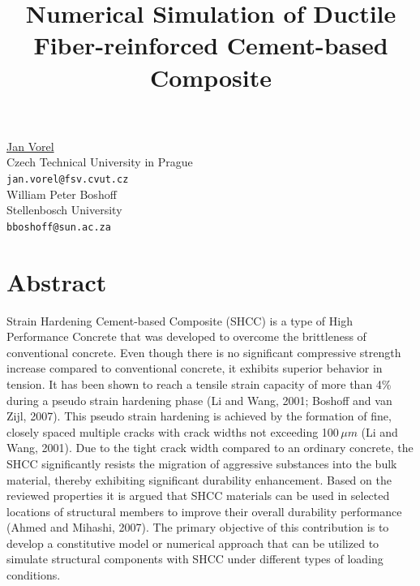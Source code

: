 \documentclass[article, A4, 11pt]{llncs}%
\begin{document}
\title{Numerical Simulation of Ductile Fiber-reinforced Cement-based Composite}
 \author{} \institute{}
\maketitle
\begin{center}
{\large \underline{Jan Vorel}}\\
Czech Technical University in Prague\\
{\tt jan.vorel@fsv.cvut.cz}
\\ \vspace{4mm}
{\large William Peter Boshoff}\\
Stellenbosch University\\
{\tt bboshoff@sun.ac.za}
\end{center}

\section*{Abstract}
Strain Hardening Cement-based Composite (SHCC) is a type of High Performance Concrete that was developed to overcome the brittleness of conventional concrete. Even though there is no significant compressive strength increase compared to conventional concrete, it exhibits superior behavior in tension. It has been shown to reach a tensile strain capacity of more than 4\% during a pseudo strain hardening phase (Li and Wang, 2001; Boshoff and van Zijl, 2007). This pseudo strain hardening is achieved by the formation of fine, closely spaced multiple cracks with crack widths not exceeding 100\,$\mu m$ (Li and Wang, 2001). Due to the tight crack width compared to an ordinary concrete, the SHCC significantly resists the migration of aggressive substances into the bulk material, thereby exhibiting significant durability enhancement. Based on the reviewed properties it is argued that SHCC materials can be used in selected locations of structural members to improve their overall durability performance (Ahmed and Mihashi, 2007). The primary objective of this contribution is to develop a constitutive model or numerical approach that can be utilized to simulate structural components with SHCC under different types of loading conditions.
\end{document}
